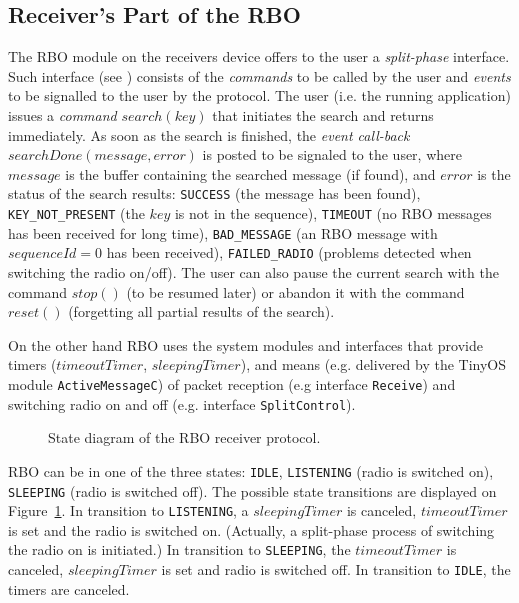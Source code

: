 \documentclass{llncs}
\begin{document}
\subsection{Receiver's Part of the RBO}
The RBO module on the receivers device offers to the user a {\em split-phase}
interface.
Such interface (see \cite{TinyOSProgramming}) consists of the {\em commands}
to be called by the user and {\em events} to be signalled to the user by the protocol. 
The user (i.e. the running application) issues a {\em command} $search(key)$ that initiates
the search and returns immediately.
As soon as the search is finished, the {\em event call-back} $searchDone(message, error)$
is posted to be signaled to the user,
where $message$ is the buffer containing the searched message (if found),
and $error$ is the status of the search results: 
\verb|SUCCESS| (the message has been found),
\verb|KEY_NOT_PRESENT| (the $key$ is not in the sequence),
\verb|TIMEOUT| (no RBO messages has been received for long time),
\verb|BAD_MESSAGE| (an RBO message with $sequenceId=0$ has been received),
\verb|FAILED_RADIO| (problems detected when switching the radio on/off).
The user can also pause the current search with the command $stop()$ 
(to be resumed later) %
or abandon it with the command $reset()$ (forgetting all partial results of the search).

On the other hand RBO uses the system modules and interfaces that 
provide timers ($timeoutTimer$, $sleepingTimer$), 
and means (e.g. delivered by the TinyOS module \verb|ActiveMessageC|) of packet reception (e.g interface \verb|Receive|) 
and switching radio on and off (e.g. interface \verb|SplitControl|).  
\begin{figure}
\caption{State diagram of the RBO receiver protocol.\label{RBO-states}}
\end{figure}
RBO can be in one of the three states: 
\verb|IDLE|, 
\verb|LISTENING| (radio is switched on),
\verb|SLEEPING| (radio is switched off).
The possible state transitions are displayed on Figure~\ref{RBO-states}.
In transition to \verb|LISTENING|,  a $sleepingTimer$ is canceled,  $timeoutTimer$ is set 
and the radio is switched on. 
(Actually, a split-phase process of switching the radio on
is initiated.)
In transition to \verb|SLEEPING|, the $timeoutTimer$ is canceled,
$sleepingTimer$ is set and radio is switched off.
In transition to \verb|IDLE|, the timers are canceled.
\end{document}

